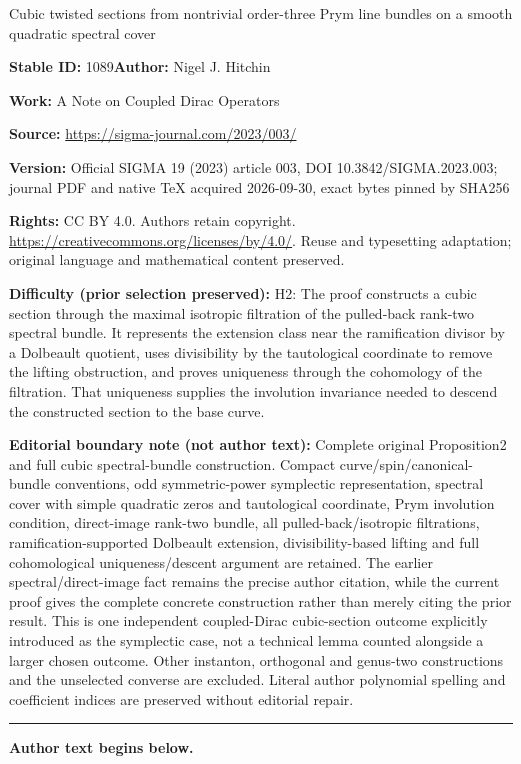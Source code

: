 \documentclass[11pt]{article}
\numberwithin{equation}{section}
\begin{document}
\begin{center}\Large Cubic twisted sections from nontrivial order-three Prym line bundles on a smooth quadratic spectral cover\end{center}
\noindent\textbf{Stable ID:} 1089\quad\textbf{Author:} Nigel J. Hitchin\par
\noindent\textbf{Work:} A Note on Coupled Dirac Operators\par
\noindent\textbf{Source:} \url{https://sigma-journal.com/2023/003/}\par
\noindent\textbf{Version:} Official SIGMA 19 (2023) article 003, DOI 10.3842/SIGMA.2023.003; journal PDF and native TeX acquired 2026-09-30, exact bytes pinned by SHA256\par
\noindent\textbf{Rights:} CC BY 4.0. Authors retain copyright. \url{https://creativecommons.org/licenses/by/4.0/}. Reuse and typesetting adaptation; original language and mathematical content preserved.\par
\noindent\textbf{Difficulty (prior selection preserved):} {\CJKfont H2: The proof constructs a cubic section through the maximal isotropic filtration of the pulled-back rank-two spectral bundle. It represents the extension class near the ramification divisor by a Dolbeault quotient, uses divisibility by the tautological coordinate to remove the lifting obstruction, and proves uniqueness through the cohomology of the filtration. That uniqueness supplies the involution invariance needed to descend the constructed section to the base curve.}\par
\medskip\noindent\textbf{Editorial boundary note (not author text):} Complete original Proposition2 and full cubic spectral-bundle construction. Compact curve/spin/canonical-bundle conventions, odd symmetric-power symplectic representation, spectral cover with simple quadratic zeros and tautological coordinate, Prym involution condition, direct-image rank-two bundle, all pulled-back/isotropic filtrations, ramification-supported Dolbeault extension, divisibility-based lifting and full cohomological uniqueness/descent argument are retained. The earlier spectral/direct-image fact remains the precise author citation, while the current proof gives the complete concrete construction rather than merely citing the prior result. This is one independent coupled-Dirac cubic-section outcome explicitly introduced as the symplectic case, not a technical lemma counted alongside a larger chosen outcome. Other instanton, orthogonal and genus-two constructions and the unselected converse are excluded. Literal author polynomial spelling and coefficient indices are preserved without editorial repair.\par
\medskip\hrule\medskip\noindent\textbf{Author text begins below.}\par
\setcounter{section}{2}\setcounter{proposition}{1}\setcounter{equation}{0}
\end{document}
